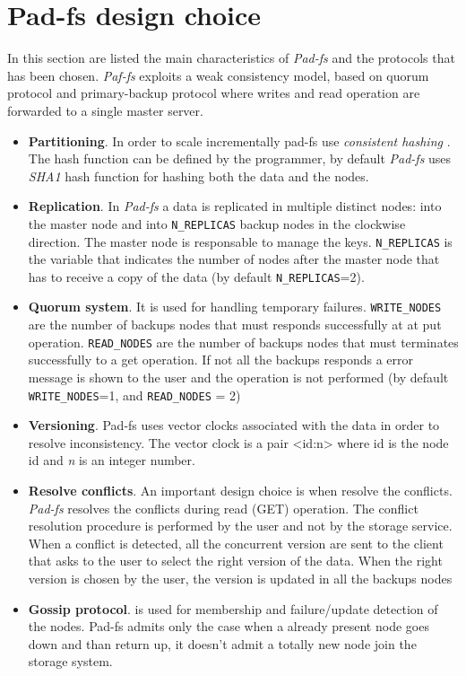 \chapter {Pad-fs design choice}
In this section are listed the main characteristics of \emph{Pad-fs} and the protocols that has been chosen.  \emph{Paf-fs} exploits a weak consistency model, based on quorum protocol and primary-backup protocol where writes and read operation are forwarded to a single master server.

\begin{itemize}
\item \textbf{Partitioning}. In order to scale incrementally pad-fs use \textit{consistent hashing} . The hash function can be defined by the programmer, by default \emph{Pad-fs} uses \textit{SHA1} hash function  for hashing both the data and the nodes.

\item \textbf{Replication}. In \emph{Pad-fs} a data is replicated in multiple distinct nodes: into the master node and into \texttt{N\_REPLICAS} backup nodes in the clockwise direction. The master node is responsable to manage the keys. \texttt{N\_REPLICAS} is the variable that indicates the number of nodes after the master node that has to receive a copy of the data (by default \texttt{N\_REPLICAS}=2).

\item \textbf{Quorum system}. It is used for handling temporary failures. \texttt{WRITE\_NODES} are the number of backups nodes that must responds successfully at at put operation. \texttt{READ\_NODES} are the number of backups nodes that must terminates successfully to a get operation. If not all the backups responds a error message is shown to the user and the operation is not performed (by default \texttt{WRITE\_NODES}=1, and  \texttt{READ\_NODES} = 2)

\item \textbf{Versioning}. Pad-fs uses vector clocks associated with the data in order to resolve inconsistency. The vector clock is a pair  <id:n>  where id is the node id and \textit{n} is an integer number. 

\item \textbf{Resolve conflicts}. An important design choice is when resolve the conflicts.
\emph{Pad-fs} resolves the conflicts during read (GET) operation. 
The conflict resolution procedure is performed by the user and not by the storage service. When a conflict is detected, all the concurrent version  are sent to the client that asks to the user to select the right version of the data. When the right version is chosen by the user, the version is updated in all the backups nodes

\item \textbf{Gossip protocol}. is used for membership and failure/update detection of the nodes. Pad-fs admits only the case when a already present node goes down and than return up, it doesn't admit a totally  new node join the storage system.

\end{itemize}
